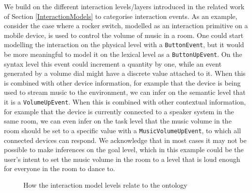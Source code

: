 We build on the different interaction levels/layers introduced in the related work of Section \ref{InteractionModels} to categorise interaction events. As an example, consider the case where a rocker switch, modelled as an interaction primitive on a mobile device, is used to control the volume of music in a room. One could start modelling the interaction on the physical level with a \texttt{ButtonEvent}, but it would be more meaningful to model it on the lexical level as a \texttt{ButtonUpEvent}. On the syntax level this event could increment a quantity by one, while an event generated by a volume dial might have a discrete value attached to it. When this is combined with other device information, for example that the device is being used to stream music to the environment, we can infer on the semantic level that it is a \texttt{VolumeUpEvent}. When this is combined with other contextual information, for example that the device is currently connected to a speaker system in the same room, we can even infer on the task level that the music volume in the room should be set to a specific value with a \texttt{MusicVolumeUpEvent}, to which all connected devices can respond. We acknowledge that in most cases it may not be possible to make inferences on the goal level, which in this example could be the user's intent to set the music volume in the room to a level that is loud enough for everyone in the room to dance to.

\begin{figure}[bth]
	\caption{How the interaction model levels relate to the ontology}
	\label{InteractionModelToOntology}        
\end{figure}

